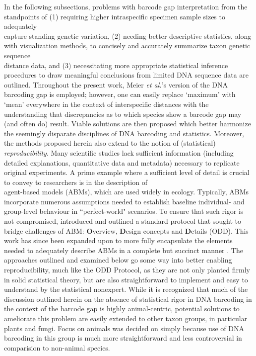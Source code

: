 In the following subsections, problems with barcode gap interpretation from the \\ standpoints of (1) requiring higher intraspecific specimen sample sizes to adequately \\ capture standing genetic variation, (2) needing better descriptive statistics, along with visualization methods, to concisely and accurately summarize taxon genetic sequence \\ distance data, and (3) necessitating more appropriate statistical inference procedures to draw meaningful conclusions from limited DNA sequence data are outlined. Throughout the present work, Meier \textit{et al.}'s \cite{meier2008use} version of the DNA barcoding gap is employed; however, one can easily replace `maximum' with `mean' everywhere in the context of interspecific distances with the understanding that discrepancies as to which species show a barcode gap may (and often do) result. Viable solutions are then proposed which better harmonize the seemingly disparate disciplines of DNA barcoding and statistics. Moreover, the methods proposed herein also extend to the notion of (statistical) \textit{reproducibility}. Many scientific studies lack sufficient information (including detailed explanations, quantitative data and metadata) necessary to replicate original experiments. A prime example where a sufficient level of detail is crucial to convey to researchers is in the description of \\ agent-based models (ABMs), which are used widely in ecology. Typically, ABMs \\ incorporate numerous assumptions needed to establish baseline individual- and group-level behaviour in ``perfect-world" scenarios. To ensure that such rigor is not compromised, \cite{grimm2006standard} introduced and outlined a standard protocol that sought to bridge challenges of ABM: \textbf{O}verview, \textbf{D}esign concepts and \textbf{D}etails (ODD). This work has since been expanded upon to more fully encapsulate the elements needed to adequately describe ABMs in a complete but succinct manner \cite{grimm2010odd}. The approaches outlined and examined below go some way into better enabling reproducibility, much like the ODD Protocol, as they are not only planted firmly in solid statistical theory, but are also straightforward to implement and easy to understand by the statistical nonexpert. While it is recognized that much of the discussion outlined herein on the absence of statistical rigor in DNA barcoding in the context of the barcode gap is highly animal-centric, potential solutions to ameliorate this problem are easily extended to other taxon groups, in particular plants and fungi. Focus on animals was decided on simply because use of DNA barcoding in this group is much more straightforward and less controversial in comparision to non-animal species.



